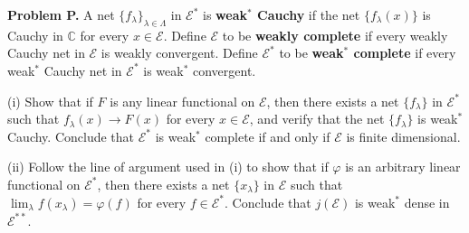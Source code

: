 \textbf{Problem P.} A net $\{f_{\lambda}\}_{\lambda \in \Lambda}$ in $\mathcal{E}^*$ is \textbf{weak$^*$ Cauchy} if the net $\{f_{\lambda}(x)\}$ is Cauchy in $\mathbb{C}$ for every $x \in \mathcal{E}$. Define $\mathcal{E}$ to be \textbf{weakly complete} if every weakly Cauchy net in $\mathcal{E}$ is weakly convergent. Define $\mathcal{E}^*$ to be \textbf{weak$^*$ complete} if every weak$^*$ Cauchy net in $\mathcal{E}^*$ is weak$^*$ convergent.

(i) Show that if $F$ is any linear functional on $\mathcal{E}$, then there exists a net $\{f_{\lambda}\}$ in $\mathcal{E}^*$ such that $f_{\lambda}(x) \rightarrow F(x)$ for every $x \in \mathcal{E}$, and verify that the net $\{f_{\lambda}\}$ is weak$^*$ Cauchy. Conclude that $\mathcal{E}^*$ is weak$^*$ complete if and only if $\mathcal{E}$ is finite dimensional.

(ii) Follow the line of argument used in (i) to show that if $\varphi$ is an arbitrary linear functional on $\mathcal{E}^*$, then there exists a net $\{x_{\lambda}\}$ in $\mathcal{E}$ such that $\lim_{\lambda} f(x_{\lambda}) = \varphi(f)$ for every $f \in \mathcal{E}^*$. Conclude that $j(\mathcal{E})$ is weak$^*$ dense in $\mathcal{E}^{**}$.
